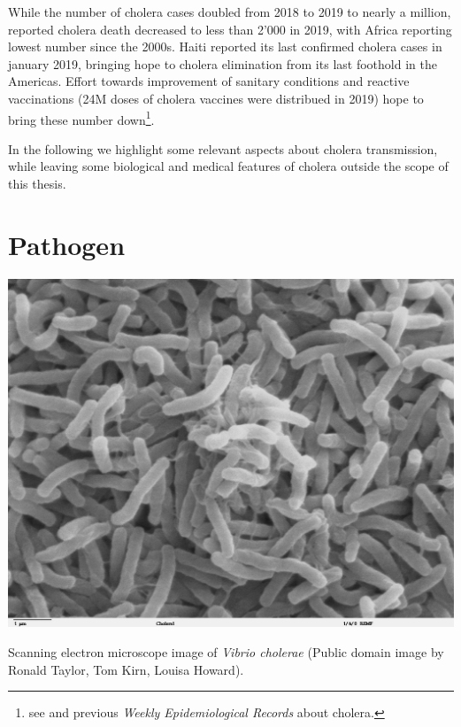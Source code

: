 While the number of cholera cases doubled from 2018 to 2019 to nearly a million, reported cholera death decreased to less than 2'000 in 2019, with Africa reporting lowest number since the 2000s. Haiti reported its last confirmed cholera cases in january 2019, bringing hope to cholera elimination from its last foothold in the Americas. Effort towards improvement of sanitary conditions and reactive vaccinations (24M doses of cholera vaccines were distribued in 2019) hope to bring these number down\footnote{see  and previous \textit{Weekly Epidemiological Records} about cholera.}. 

In the following we highlight some relevant aspects about cholera transmission, while leaving some biological and medical features of cholera outside the scope of this thesis.


\section{Pathogen} 
\begin{marginfigure}[3\baselineskip]
\centering
\includegraphics{fig/vibrio}
\caption[Vibrio cholerae bacteria]{\footnotesize Scanning electron microscope image of \textit{Vibrio cholerae} (Public domain image by Ronald Taylor, Tom Kirn, Louisa Howard).}
\label{rain}
\end{marginfigure}

